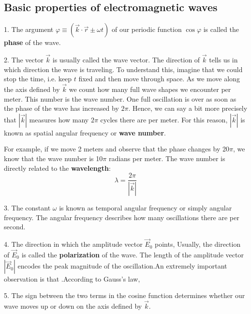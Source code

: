 \subsection{Basic properties of electromagnetic waves}
1. The argument $\varphi \equiv(\vec{k} \cdot \vec{r} \pm \omega t)$ of our periodic function $\cos \varphi$ is called the \textbf{phase} of the wave.

2. The vector $\vec{k}$ is usually called the wave vector. The direction of $\vec{k}$ tells us in which direction the wave is traveling. \textbf{} To understand this, imagine that we could stop the time, i.e. keep $t$ fixed and then move through space. As we move along the axis defined by $\vec{k}$ we count how many full wave shapes we encounter per meter. This number is the wave number. One full oscillation is over as soon as the phase of the wave has increased by $2\pi$. Hence, we can say a bit more precisely that $|\vec{k}|$ measures how many $2\pi$ cycles there are per meter. For this reason, $|\vec{k}|$ is known as spatial angular frequency or \textbf{wave number}.

For example, if we move 2 meters and observe that the phase changes by 20$\pi$, we know that the wave number is 10$\pi$ radians per meter. The wave number is directly related to the \textbf{wavelength}:
\begin{equation}
\lambda=\frac{2 \pi}{|\vec{k}|}
\end{equation}

3. The constant $\omega$ is known as temporal angular frequency or simply angular frequency. The angular frequency describes how many oscillations there are per second. 

4. The direction in which the amplitude vector $\vec{E}_{0}$ points,  Usually, the direction of $\vec{E}_{0}$ is called the \textbf{polarization} of the wave. The length of the amplitude vector $\left|\vec{E}_{0}\right|$ encodes the peak magnitude of the oscillation.An extremely important observation is that .According to Gauss's law, 

5. The sign between the two terms in the cosine function determines whether our wave moves up or down on the axis defined by $\vec{k}$.

